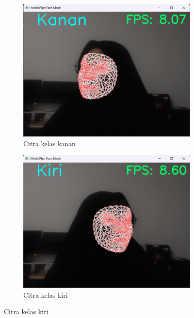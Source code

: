 \begin{figure}[H]
  \centering
  \begin{subfigure}{0.3\textwidth}
      \centering
      \includegraphics[width=\linewidth]{gambar/15 kanan.png}
      \caption{Citra kelas kanan}
      \label{fig:image1}
  \end{subfigure}
  \hfill
  \begin{subfigure}{0.3\textwidth}
      \centering
      \includegraphics[width=\linewidth]{gambar/15 kiri.png}
      \caption{Citra kelas kiri}
      \label{fig:image2}
  \end{subfigure}
  \hfill

\end{figure}
